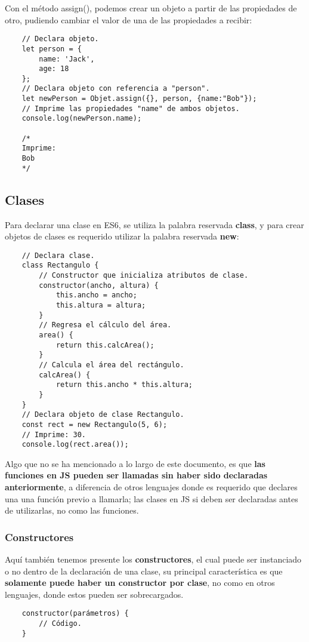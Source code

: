 Con el método assign(), podemos crear un objeto a partir de las propiedades de otro, pudiendo cambiar el valor de una de las propiedades a recibir:
\begin{lstlisting}
    // Declara objeto.
    let person = {
        name: 'Jack',
        age: 18
    };
    // Declara objeto con referencia a "person".
    let newPerson = Objet.assign({}, person, {name:"Bob"});
    // Imprime las propiedades "name" de ambos objetos.
    console.log(newPerson.name);

    /*
    Imprime:
    Bob
    */
\end{lstlisting}


\subsection{Clases}

Para declarar una clase en ES6, se utiliza la palabra reservada \textbf{class}, y para crear objetos de clases es requerido utilizar la palabra reservada \textbf{new}:
\begin{lstlisting}
    // Declara clase.
    class Rectangulo {
        // Constructor que inicializa atributos de clase.
        constructor(ancho, altura) {
            this.ancho = ancho;
            this.altura = altura;
        }
        // Regresa el cálculo del área.
        area() {
            return this.calcArea();
        }
        // Calcula el área del rectángulo.
        calcArea() {
            return this.ancho * this.altura;
        }
    }
    // Declara objeto de clase Rectangulo.
    const rect = new Rectangulo(5, 6);
    // Imprime: 30.
    console.log(rect.area());
\end{lstlisting}

Algo que no se ha mencionado a lo largo de este documento, es que \textbf{las funciones en JS pueden ser llamadas sin haber sido declaradas anteriormente}, a diferencia de otros lenguajes donde es requerido que declares una una función previo a llamarla; las clases en JS si deben ser declaradas antes de utilizarlas, no como las funciones.


\subsubsection{Constructores}

Aquí también tenemos presente los \textbf{constructores}, el cual puede ser instanciado o no dentro de la declaración de una clase, su principal característica es que \textbf{solamente puede haber un constructor por clase}, no como en otros lenguajes, donde estos pueden ser sobrecargados.
\begin{lstlisting}
    constructor(parámetros) {
        // Código.
    }
\end{lstlisting}


